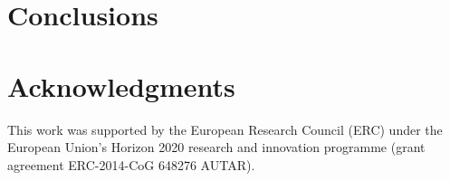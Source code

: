 \documentclass[12pt,notitlepage,a4paper]{article}
\theoremstyle{definition}
\begin{document}
\section*{Conclusions}


\section*{Acknowledgments}
This work was supported by the European Research Council (ERC) under the European Union's Horizon 2020 research and innovation programme (grant agreement ERC-2014-CoG 648276 AUTAR).\par
{}

\pagebreak

	
\end{document}
